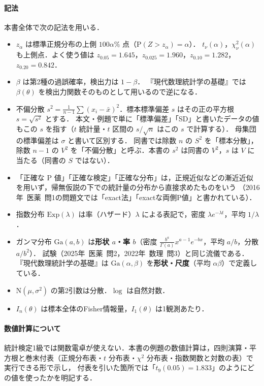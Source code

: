 \documentclass[a4paper,11pt,openany]{ltjsbook}
\newcommand{\tagbox}[2]{\tcbox[on line,boxsep=0.5pt,left=2pt,right=2pt,top=0.5pt,bottom=0.5pt,
  colframe=#1,colback=#1!10,boxrule=0.4pt,arc=1pt]{\scriptsize\bfseries\textcolor{#1}{#2}}}
\newcommand{\Youchui}{\tagbox{bkpurple}{要注意}}
\newcommand{\kakomon}[2]{\mbox{#1年 医薬 問#2}}
\newcommand{\kakomonSM}[2]{\mbox{#1年 数理 問#2}}
\newcommand{\Prob}{\mathrm{P}}
\newcommand{\Normal}{\mathrm{N}}
\newcommand{\Ga}{\mathrm{Ga}}
\newcommand{\Ex}{\mathrm{Exp}}
\begin{document}
\paragraph{記法}
本書全体で次の記法を用いる．
\begin{itemize}
\item $z_\alpha$ は標準正規分布の上側 $100\alpha\%$ 点（$\Prob(Z>z_\alpha)=\alpha$）．
      $t_\nu(\alpha)$，$\chi^2_\nu(\alpha)$ も上側点．よく使う値は $z_{0.05}=1.645$，$z_{0.025}=1.960$，$z_{0.10}=1.282$，$z_{0.20}=0.842$．
\item $\beta$ は第2種の過誤確率，検出力は $1-\beta$．
      \Youchui 『現代数理統計学の基礎』では $\beta(\theta)$ を検出力関数そのものとして用いるので逆になる．
\item 不偏分散 $s^2=\frac{1}{n-1}\sum(x_i-\bar x)^2$．標本標準偏差 $s$ はその正の平方根 $s=\sqrt{s^2}$ とする．
      本文・例題で単に「標準偏差」「SD」と書いたデータの値もこの $s$ を指す（$t$ 統計量・$t$ 区間の $s/\sqrt n$ はこの $s$ で計算する）．
      母集団の標準偏差は $\sigma$ と書いて区別する．
      \Youchui 同書では除数 $n$ の $S^2$ を「標本分散」，除数 $n-1$ の $V^2$ を「不偏分散」と呼ぶ．本書の $s^2$ は同書の $V^2$，$s$ は $V$ に当たる（同書の $S$ ではない）．
\item 「正確な P 値」「正確な検定」「正確な分布」は，正規近似などの漸近近似を用いず，帰無仮説の下での統計量の分布から直接求めたものをいう
      （\kakomon{2016}{1}の問題文では「exact法」「exactな両側P値」と書かれている）．
\item 指数分布 $\Ex(\lambda)$ は率（ハザード）$\lambda$ による表記で，密度 $\lambda e^{-\lambda t}$，平均 $1/\lambda$．
\item ガンマ分布 $\Ga(a,b)$ は\textbf{形状 $a$・率 $b$}（密度 $\frac{b^a}{\Gamma(a)}x^{a-1}e^{-bx}$，平均 $a/b$，分散 $a/b^2$）．
      試験（\kakomon{2025}{2}，\kakomonSM{2022}{3}）と同じ流儀である．
      \Youchui 『現代数理統計学の基礎』は $\Ga(\alpha,\beta)$ を\textbf{形状・尺度}（平均 $\alpha\beta$）で定義している．
\item $\Normal(\mu,\sigma^2)$ の第2引数は分散．$\log$ は自然対数．
\item $I_n(\theta)$ は標本全体のFisher情報量，$I_1(\theta)$ は1観測あたり．
\end{itemize}

\enlargethispage{2\baselineskip}
\paragraph{数値計算について}
統計検定1級では関数電卓が使えない．本書の例題の数値計算は，四則演算・平方根と巻末付表（正規分布表・$t$ 分布表・$\chi^2$ 分布表・指数関数と対数の表）で実行できる形で示し，
付表を引いた箇所では「$t_9(0.05)=1.833$」のようにどの値を使ったかを明記する．
\end{document}
